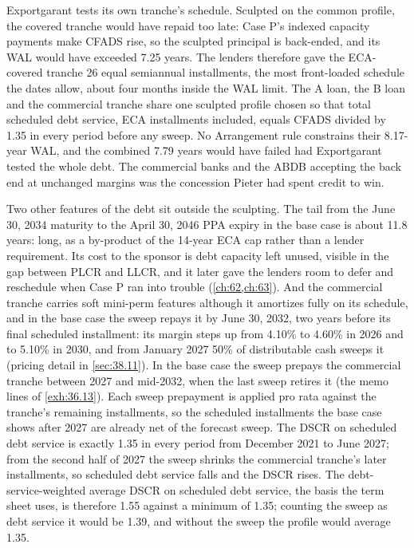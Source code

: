 Exportgarant tests its own tranche's schedule. Sculpted on the common profile, the covered tranche would have repaid too late: Case P's indexed capacity payments make CFADS rise, so the sculpted principal is back-ended, and its WAL would have exceeded 7.25 years. The lenders therefore gave the ECA-covered tranche 26 equal semiannual installments, the most front-loaded schedule the dates allow, about four months inside the WAL limit. The A loan, the B loan and the commercial tranche share one sculpted profile chosen so that total scheduled debt service, ECA installments included, equals CFADS divided by 1.35 in every period before any sweep. No Arrangement rule constrains their 8.17-year WAL, and the combined 7.79 years would have failed had Exportgarant tested the whole debt. The commercial banks and the ABDB accepting the back end at unchanged margins was the concession Pieter had spent credit to win.

Two other features of the debt sit outside the sculpting. The tail from the June 30, 2034 maturity to the April 30, 2046 PPA expiry in the base case is about 11.8 years: long, as a by-product of the 14-year ECA cap rather than a lender requirement. Its cost to the sponsor is debt capacity left unused, visible in the gap between PLCR and LLCR, and it later gave the lenders room to defer and reschedule when Case P ran into trouble (\cref{ch:62,ch:63}). And the commercial tranche carries soft mini-perm features although it amortizes fully on its schedule, and in the base case the sweep repays it by June 30, 2032, two years before its final scheduled installment: its margin steps up from 4.10\% to 4.60\% in 2026 and to 5.10\% in 2030, and from January 2027 50\% of distributable cash sweeps it (pricing detail in \cref{sec:38.11}). In the base case the sweep prepays the commercial tranche between 2027 and mid-2032, when the last sweep retires it (the memo lines of \cref{exh:36.13}). Each sweep prepayment is applied pro rata against the tranche's remaining installments, so the scheduled installments the base case shows after 2027 are already net of the forecast sweep. The DSCR on scheduled debt service is exactly 1.35\x{} in every period from December 2021 to June 2027; from the second half of 2027 the sweep shrinks the commercial tranche's later installments, so scheduled debt service falls and the DSCR rises. The debt-service-weighted average DSCR on scheduled debt service, the basis the term sheet uses, is therefore 1.55\x{} against a minimum of 1.35\x; counting the sweep as debt service it would be 1.39\x, and without the sweep the profile would average 1.35\x.

